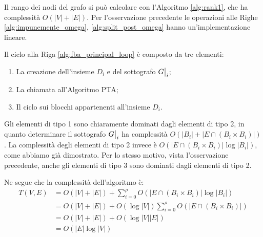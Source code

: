 \begin{proof2}
    Il rango dei nodi del grafo si può calcolare con l'Algoritmo \ref{alg:rank1}, che ha complessità $O(|V|+|E|)$. Per l'osservazione precedente le operazioni alle Righe \ref{alg:impunemente_omega}, \ref{alg:split_post_omega} hanno un'implementazione lineare.

    Il ciclo alla Riga \ref{alg:fba_principal_loop} è composto da tre elementi:
    \begin{enumerate}
        \item La creazione dell'insieme $D_i$ e del sottografo $\restr{G}{i}$;
        \item La chiamata all'Algoritmo PTA;
        \item Il ciclo sui blocchi appartenenti all'insieme $D_i$.
    \end{enumerate}
    Gli elementi di tipo 1 sono chiaramente dominati dagli elementi di tipo 2, in quanto determinare il sottografo $\restr{G}{i}$ ha complessità $O(|B_i| + |E \cap (B_i \times B_i)|)$. La complessità degli elementi di tipo 2 invece è $O(|E \cap (B_i \times B_i)| \log |B_i|)$, come abbiamo già dimostrato.  Per lo stesso motivo, vista l'osservazione precedente, anche gli elementi di tipo 3 sono dominati dagli elementi di tipo 2.

    Ne segue che la complessità dell'algoritmo è:
    \begin{align*}
        T(V,E) &= O(|V| + |E|) + \sum_{i=0}^\rho O(|E \cap (B_i \times B_i)| \log |B_i|)\\
        &= O(|V| + |E|) +  O(\log |V|) \sum_{i=0}^\rho O(|E \cap (B_i \times B_i)|)\\
        &= O(|V| + |E|) +  O(\log |V| |E|)\\
        &= O(|E| \log |V|)
    \end{align*}
\end{proof2}
